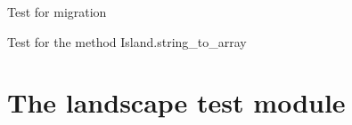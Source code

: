 \documentclass[a4paper,10pt,english]{sphinxmanual}
\begin{document}
\begin{fulllineitems}
\begin{fulllineitems}
\label{\detokenize{tests:biosim.tests.test_island.TestIsland.test_migration}}
Test for migration

\end{fulllineitems}


\begin{fulllineitems}
\label{\detokenize{tests:biosim.tests.test_island.TestIsland.test_string_to_array}}
Test for the method Island.string\_to\_array

\end{fulllineitems}


\end{fulllineitems}



\section{The landscape test module}
\label{\detokenize{tests:the-landscape-test-module}}\label{\detokenize{tests:module-biosim.tests.test_landscape}}
\end{document}
